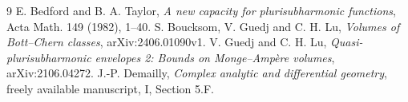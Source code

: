 \documentclass[11pt]{article}
\theoremstyle{remark}\newtheorem{remark}[theorem]{Remark}
\begin{document}
\begin{thebibliography}{9}
 E. Bedford and B. A. Taylor,
\emph{A new capacity for plurisubharmonic functions}, Acta Math. 149 (1982), 1--40.
 S. Boucksom, V. Guedj and C. H. Lu,
\emph{Volumes of Bott--Chern classes}, arXiv:2406.01090v1.
 V. Guedj and C. H. Lu,
\emph{Quasi-plurisubharmonic envelopes 2: Bounds on Monge--Amp\`ere volumes},
arXiv:2106.04272.
 J.-P. Demailly,
\emph{Complex analytic and differential geometry}, freely available manuscript,
I, Section 5.F.
\end{thebibliography}
\end{document}
